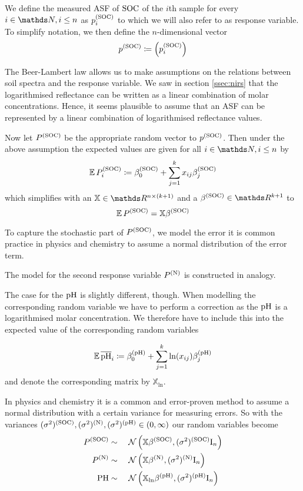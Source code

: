 	
		We define the measured ASF of $\mathrm{SOC}$ of the $i$th sample for every $i\in\SN,i\leq n$ as $p^{\mathrm{(SOC)}}_i$ to which we will also refer to as response variable.
		To simplify notation, we then define the $n$-dimensional vector
		\[
			p^{\mathrm{(SOC)}} \coloneqq \left( p^{\mathrm{(SOC)}}_i \right)
		\]

		The Beer-Lambert law allows us to make assumptions on the relations between soil spectra and the response variable.
		We saw in section \ref{ssec:nirs} that the logarithmised reflectance can be written as a linear combination of molar concentrations.
		Hence, it seems plausible to assume that an ASF can be represented by a linear combination of logarithmised reflectance values.

		Now let $P^{\mathrm{(SOC)}}$ be the appropriate random vector to $p^{\mathrm{(SOC)}}$.
		Then under the above assumption the expected values are given for all $i \in \SN, i \leq n$ by
		\[
			\operatorname{\mathbb{E}} P_i^{\mathrm{(SOC)}} \coloneqq \beta^{\mathrm{(SOC)}}_0 + \sum_{j = 1}^k{x_{ij}\beta^{\mathrm{(SOC)}}_j} 
		\]
		which simplifies with an $\mathbb{X} \in \SR^{n \times (k+1)}$ and a $\beta^\m{(SOC)} \in \SR^{k+1}$ to
		\[
			\operatorname{\mathbb{E}} P^{\mathrm{(SOC)}} = \mathbb{X}\beta^{\mathrm{(SOC)}}
		\]
		
		To capture the stochastic part of $P^{\mathrm{(SOC)}}$, we model the error
		 it is common practice in physics and chemistry to assume a normal distribution of the error term.
		
		The model for the second response variable $P^{\mathrm{(N)}}$ is constructed in analogy.
		
		The case for the $\mathrm{pH}$ is slightly different, though. 
		When modelling the corresponding random variable we have to perform a correction as the $\mathrm{pH}$ is a logarithmised molar concentration.
		We therefore have to include this into the expected value of the corresponding random variables
		
		\[
			\operatorname{\mathbb{E}} \mathrm{\overline{pH}}_i \coloneqq \beta^{\mathrm{\mathrm{(pH)}}}_0 + \sum_{j = 1}^k{\ln (x_{ij}) \beta^{\mathrm{(pH)}}_j} 
		\]
		and denote the corresponding matrix by $\mathbb{X}_{\ln}$.

		In physics and chemistry it is a common and error-proven method to assume a normal distribution with a certain variance for measuring errors.
		So with the variances $(\sigma^2)^{\mathrm{(SOC)}},(\sigma^2)^{\mathrm{(N)}},(\sigma^2)^{\mathrm{(pH)}}\in(0,\infty)$ our random variables become
		\begin{alignat*}{3}
			P^\m{(SOC)} &\sim&&\ \FN\curvb{\mathbb{X}\beta^\m{(SOC)}, (\sigma^2)^\m{(SOC)}\idmat_n} \\
			P^\m{(N)} &\sim&&\ \FN\curvb{\mathbb{X}\beta^\m{(N)}, (\sigma^2)^\m{(N)}\idmat_n} \\
			\m{PH} &\sim&&\ \FN\curvb{\mathbb{X}_{\ln}\beta^\m{(pH)}, (\sigma^2)^\m{(pH)}\idmat_n}
		\end{alignat*}
	
